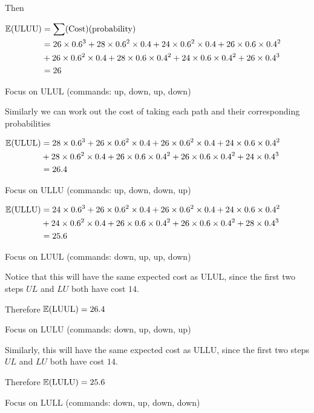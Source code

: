\begin{prob}
\begin{enumerate}[label = {\textbf{(\greek*)}}]
\begin{sol}
\begin{enumerate}[start = 1, label = {\protect\tsc{$\mathbf{S_{\arabic*}}$}}]
Then 

$\begin{aligned}
    \mathbb E(\text{ULUU}) &= \sum (\text{Cost})(\text{probability}) \\
    &= 26\times 0.6^3 + 28\times 0.6^2\times 0.4 + 24\times 0.6^2\times 0.4 + 26\times 0.6\times0.4^2 \\
    &+ 26\times 0.6^2\times 0.4 + 28\times 0.6\times 0.4^2 + 24\times 0.6\times 0.4^2 + 26\times 0.4^3 \\
    &= 26
\end{aligned}$


Focus on $\text{ULUL}$ (commands: up, down, up, down)

Similarly we can work out the cost of taking each path and their corresponding probabilities

$\begin{aligned}
    \mathbb E(\text{ULUL}) &= 28\times 0.6^3 + 26\times 0.6^2\times 0.4 + 26\times 0.6^2\times 0.4 + 24\times 0.6\times0.4^2 \\
    &+ 28\times 0.6^2\times 0.4 + 26\times 0.6\times 0.4^2 + 26\times 0.6\times 0.4^2 + 24\times 0.4^3 \\
    &= 26.4
\end{aligned}$

Focus on $\text{ULLU}$ (commands: up, down, down, up)

$\begin{aligned}
    \mathbb E(\text{ULLU}) &= 24\times 0.6^3 + 26\times 0.6^2\times 0.4 + 26\times 0.6^2\times 0.4 + 24\times 0.6\times0.4^2 \\
    &+ 24\times 0.6^2\times 0.4 + 26\times 0.6\times 0.4^2 + 26\times 0.6\times 0.4^2 + 28\times 0.4^3 \\
    &= 25.6
\end{aligned}$

Focus on $\text{LUUL}$ (commands: down, up, up, down)

Notice that this will have the same expected cost as $\text{ULUL}$, since the first two steps $UL$ and $LU$ both have cost $14$.

Therefore $\mathbb E(\text{LUUL})=26.4$

Focus on $\text{LULU}$ (commands: down, up, down, up)

Similarly, this will have the same expected cost as $\text{ULLU}$, since the first two steps $UL$ and $LU$ both have cost $14$.

Therefore $\mathbb E(\text{LULU})=25.6$

Focus on $\text{LULL}$ (commands: down, up, down, down)


\end{enumerate}
\end{sol}
\end{enumerate}
\end{prob}
